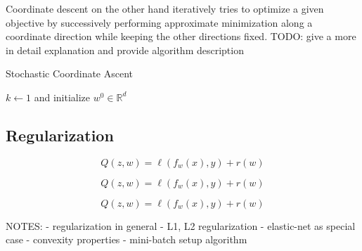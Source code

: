 Coordinate descent on the other hand iteratively tries to optimize a given objective by successively performing approximate minimization along a coordinate direction while keeping the other directions fixed.
TODO: give a more in detail explanation and provide algorithm description

\begin{algorithm}
\caption{Stochastic Coordinate Ascent}\label{alg:sca}
\begin{algorithmic}[1]
\State $k\gets 1$ and initialize $w^0 \in \mathbb{R}^d$
\Repeat
\For{}
\State
\EndFor
{}
\end{algorithmic}
\end{algorithm}

\subsection{Regularization}

\begin{equation}
Q(z,w) = \textit{$\ell$}(f_w(x),y) + \textit{r}(w)
\label{eqn:l1_reg}
\end{equation}

\begin{equation}
Q(z,w) = \textit{$\ell$}(f_w(x),y) + \textit{r}(w)
\label{eqn:l2_reg}
\end{equation}

\begin{equation}
Q(z,w) = \textit{$\ell$}(f_w(x),y) + \textit{r}(w)
\label{eqn:elastic_net}
\end{equation}

NOTES:
- regularization in general
- L1, L2 regularization
- elastic-net as special case
- convexity properties
- mini-batch setup algorithm


